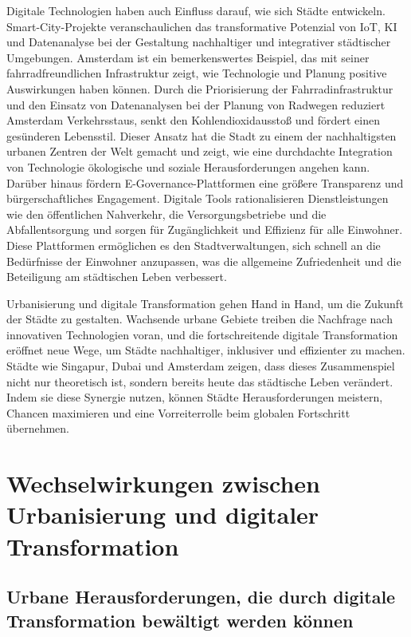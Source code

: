 \documentclass[conference,compsoc,final,a4paper, onecolumn, 11pt]{IEEEtran}
\begin{document}
Digitale Technologien haben auch Einfluss darauf, wie sich Städte entwickeln. 
Smart-City-Projekte veranschaulichen das transformative Potenzial von \ac{IoT}, \ac{KI} und Datenanalyse bei der Gestaltung nachhaltiger und integrativer städtischer Umgebungen. 
Amsterdam ist ein bemerkenswertes Beispiel, das mit seiner fahrradfreundlichen Infrastruktur zeigt, wie Technologie und Planung positive Auswirkungen haben können. 
Durch die Priorisierung der Fahrradinfrastruktur und den Einsatz von Datenanalysen bei der Planung von Radwegen reduziert Amsterdam Verkehrsstaus, senkt den Kohlendioxidausstoß und fördert einen gesünderen Lebensstil. 
Dieser Ansatz hat die Stadt zu einem der nachhaltigsten urbanen Zentren der Welt gemacht und zeigt, wie eine durchdachte Integration von Technologie ökologische und soziale Herausforderungen angehen kann. \autocite{Buehler2010-pf}
Darüber hinaus fördern E-Governance-Plattformen eine größere Transparenz und bürgerschaftliches Engagement. 
Digitale Tools rationalisieren Dienstleistungen wie den öffentlichen Nahverkehr, die Versorgungsbetriebe und die Abfallentsorgung und sorgen für Zugänglichkeit und Effizienz für alle Einwohner. 
Diese Plattformen ermöglichen es den Stadtverwaltungen, sich schnell an die Bedürfnisse der Einwohner anzupassen, was die allgemeine Zufriedenheit und die Beteiligung am städtischen Leben verbessert.

Urbanisierung und digitale Transformation gehen Hand in Hand, um die Zukunft der Städte zu gestalten. 
Wachsende urbane Gebiete treiben die Nachfrage nach innovativen Technologien voran, und die fortschreitende digitale Transformation eröffnet neue Wege, um Städte nachhaltiger, inklusiver und effizienter zu machen. 
Städte wie Singapur, Dubai und Amsterdam zeigen, dass dieses Zusammenspiel nicht nur theoretisch ist, sondern bereits heute das städtische Leben verändert. 
Indem sie diese Synergie nutzen, können Städte Herausforderungen meistern, Chancen maximieren und eine Vorreiterrolle beim globalen Fortschritt übernehmen.


\section{Wechselwirkungen zwischen Urbanisierung und digitaler Transformation}
\subsection{Urbane Herausforderungen, die durch digitale Transformation bewältigt werden können}
\end{document}
